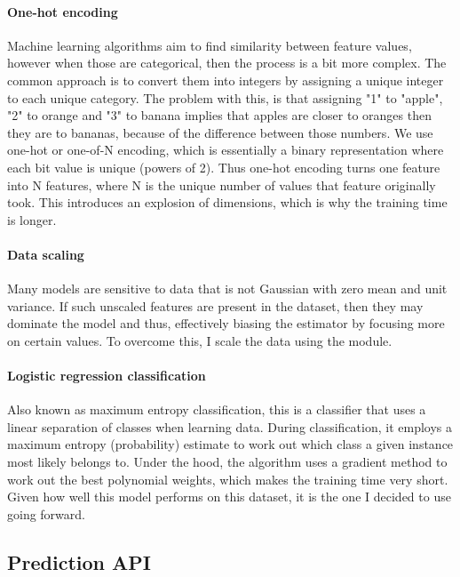 \documentclass{article}
\begin{document}
	\paragraph{One-hot encoding} Machine learning algorithms aim to find similarity between feature values, however when those are categorical, then the process is a bit more complex. The common approach is to convert them into integers by assigning a unique integer to each unique category. The problem with this, is that assigning "1" to "apple", "2" to orange and "3" to banana implies that apples are closer to oranges then they are to bananas, because of the difference between those numbers. We use one-hot or one-of-N encoding, which is essentially a binary representation where each bit value is unique (powers of 2). Thus one-hot encoding turns one feature into N features, where N is the unique number of values that feature originally took. This introduces an explosion of dimensions, which is why the training time is longer.
	
	\paragraph{Data scaling} Many models are sensitive to data that is not Gaussian with zero mean and unit variance. If such unscaled features are present in the dataset, then they may dominate the model and thus, effectively biasing the estimator by focusing more on certain values. To overcome this, I scale the data using the  module.
	
	\paragraph{Logistic regression classification} Also known as maximum entropy classification, this is a classifier that uses a linear separation of classes when learning data. During classification, it employs a maximum entropy (probability) estimate to work out which class a given instance most likely belongs to. Under the hood, the algorithm uses a gradient method to work out the best polynomial weights, which makes the training time very short. Given how well this model performs on this dataset, it is the one I decided to use going forward.

	\subsection{Prediction API}
\end{document}
